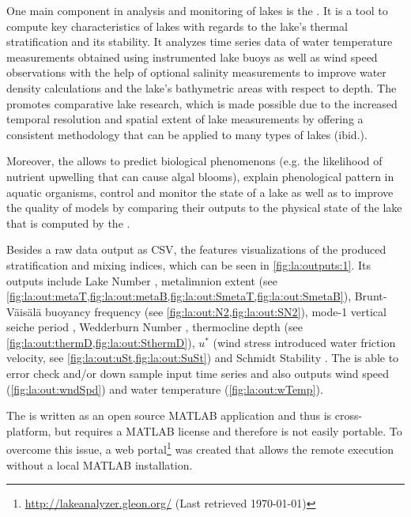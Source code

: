 One main component in analysis and monitoring of lakes is the \la \citep{read2011derivation}. It is a tool to compute key characteristics of lakes with regards to the lake's thermal stratification and its stability. It analyzes time series data of water temperature measurements obtained using instrumented lake buoys as well as wind speed observations with the help of optional salinity measurements to improve water density calculations and the lake's bathymetric areas with respect to depth. The \la promotes comparative lake research, which is made possible due to the increased temporal resolution and spatial extent of lake measurements by offering a consistent methodology that can be applied to many types of lakes (ibid.).

Moreover, the \la allows to predict biological phenomenons (e.g. the likelihood of nutrient upwelling that can cause algal blooms), explain phenological pattern in aquatic organisms, control and monitor the state of a lake as well as to improve the quality of models by comparing their outputs to the physical state of the lake that is computed by the \la.



Besides a raw data output as \ac{CSV}, the \la features visualizations of the produced stratification and mixing indices, which can be seen in \cref{fig:la:outputs:1}. Its outputs include Lake Number \citep[see \cref{fig:la:out:Ln,fig:la:out:SLn},][]{imberger1990}, metalimnion extent (see \cref{fig:la:out:metaT,fig:la:out:metaB,fig:la:out:SmetaT,fig:la:out:SmetaB}), Brunt-Väisälä buoyancy frequency (see \cref{fig:la:out:N2,fig:la:out:SN2}), mode-1 vertical seiche period \citep[see \cref{fig:la:out:T1,fig:la:out:ST1},][]{monismith1986}, Wedderburn Number \citep[see \cref{fig:la:out:W,fig:la:out:SW},][]{thompson1980}, thermocline depth (see \cref{fig:la:out:thermD,fig:la:out:SthermD}), $u^{*}$ (wind stress introduced water friction velocity, see \cref{fig:la:out:uSt,fig:la:out:SuSt}) and Schmidt Stability \citep[see \cref{fig:la:out:St},][]{schmidt1928,hutchinson1957,idso1973}. The \la is able to error check and/or down sample input time series and also outputs wind speed (\cref{fig:la:out:wndSpd}) and water temperature (\cref{fig:la:out:wTemp}).

The \la is written as an open source MATLAB application and thus is cross-platform, but requires a MATLAB license and therefore is not easily portable. To overcome this issue, a web portal\footnote{\url{http://lakeanalyzer.gleon.org/} (Last retrieved \today)} was created that allows the remote \la execution without a local MATLAB installation.

